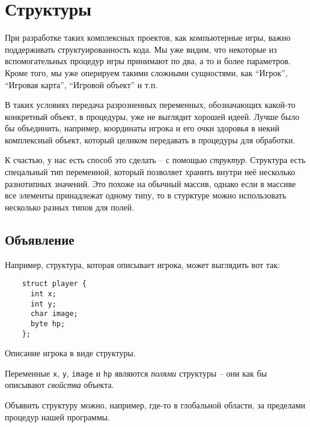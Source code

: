 \documentclass[../sparc.tex]{subfiles}
\begin{document}
\section{Структуры}

При разработке таких комплексных проектов, как компьютерные игры, важно
поддерживать структуированность кода.  Мы уже видим, что некоторые из
вспомогательных процедур игры принимают по два, а то и более параметров.  Кроме
того, мы уже оперируем такими сложными сущностями, как ``Игрок'', ``Игровая
карта'', ``Игровой объект'' и т.п.

В таких условиях передача разрозненных переменных, обозначающих какой-то
конкретный объект, в процедуры, уже не выглядит хорошей идеей.  Лучше было бы
объединить, например, координаты игрока и его очки здоровья в некий комплексный
объект, который целиком передавать в процедуры для обработки.

К счастью, у нас есть способ это сделать -- с помощью \emph{структур}.  Структура
есть спецальный тип переменной, который позволяет хранить внутри неё несколько
разнотипных значений.  Это похоже на обычный массив, однако если в массиве все
элементы принадлежат одному типу, то в стурктуре можно использовать несколько
разных типов для полей.

\subsection{Объявление}

Например, структура, которая описывает игрока, может выглядить вот так:

\begin{listing}[H]
  \begin{verbatim}
    struct player {
      int x;
      int y;
      char image;
      byte hp;
    };
  \end{verbatim}
  \caption{Описание игрока в виде структуры.}
  \label{listing:game-dev-structure}
\end{listing}

Переменные \texttt{x}, \texttt{y}, \texttt{image} и \texttt{hp} являются
\emph{полями} структуры -- они как бы описывают \emph{свойства} объекта.

Объявить структуру можно, например, где-то в глобальной области, за пределами
процедур нашей программы.
\end{document}
